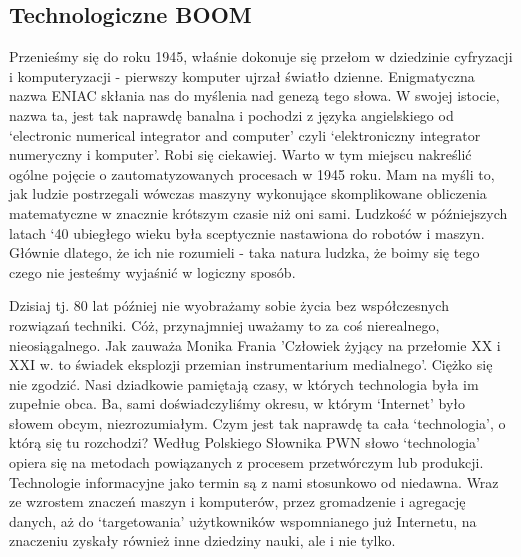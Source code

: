 \documentclass{article}
\begin{document}
\subsection{Technologiczne BOOM}
Przenieśmy się do roku 1945, właśnie dokonuje się przełom w dziedzinie cyfryzacji i komputeryzacji - pierwszy komputer ujrzał światło dzienne. Enigmatyczna nazwa ENIAC skłania nas do myślenia nad genezą tego słowa. W swojej istocie, nazwa ta, jest tak naprawdę banalna i pochodzi z języka angielskiego od ‘electronic numerical integrator and computer’\cite{ref4} czyli ‘elektroniczny integrator numeryczny i komputer’. Robi się ciekawiej. Warto w tym miejscu nakreślić ogólne pojęcie o  zautomatyzowanych procesach w 1945 roku. Mam na myśli to, jak ludzie postrzegali wówczas maszyny wykonujące skomplikowane obliczenia matematyczne w znacznie krótszym czasie niż oni sami. Ludzkość w późniejszych latach ‘40 ubiegłego wieku była sceptycznie nastawiona do robotów i maszyn. Głównie dlatego, że ich nie rozumieli - taka natura ludzka, że boimy się tego czego nie jesteśmy wyjaśnić w logiczny sposób.
\par
Dzisiaj tj. 80 lat później nie wyobrażamy sobie życia bez współczesnych rozwiązań techniki. Cóż, przynajmniej uważamy to za coś nierealnego, nieosiągalnego. Jak zauważa Monika Frania 'Człowiek żyjący na przełomie XX i XXI w. to świadek eksplozji przemian instrumentarium medialnego'\cite{ref5}. Ciężko się nie zgodzić. Nasi dziadkowie pamiętają czasy, w których technologia była im zupełnie obca. Ba, sami doświadczyliśmy okresu, w którym ‘Internet’ było słowem obcym, niezrozumiałym. Czym jest tak naprawdę ta cała ‘technologia’, o którą się tu rozchodzi? Według Polskiego Słownika PWN\cite{ref6} słowo ‘technologia’ opiera się na metodach powiązanych z procesem przetwórczym lub produkcji. Technologie informacyjne jako termin są z nami stosunkowo od niedawna. Wraz ze wzrostem znaczeń maszyn i komputerów, przez gromadzenie i agregację danych, aż do ‘targetowania’ użytkowników wspomnianego już Internetu, na znaczeniu zyskały również inne dziedziny nauki, ale i nie tylko.
\par
\end{document}
